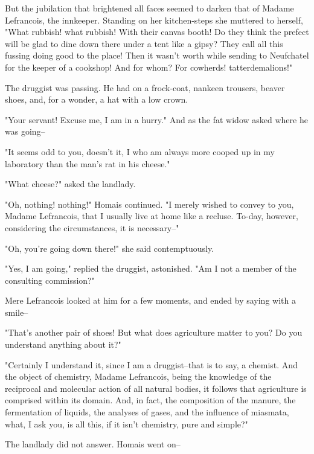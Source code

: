 \documentclass[11pt,twocolumn]{ltugboat}
\begin{document}
But the jubilation that brightened all faces seemed to darken that of
Madame Lefrancois, the innkeeper. Standing on her kitchen-steps she
muttered to herself, "What rubbish! what rubbish! With their canvas
booth! Do they think the prefect will be glad to dine down there under
a tent like a gipsy? They call all this fussing doing good to the place!
Then it wasn't worth while sending to Neufchatel for the keeper of a
cookshop! And for whom? For cowherds! tatterdemalions!"

The druggist was passing. He had on a frock-coat, nankeen trousers,
beaver shoes, and, for a wonder, a hat with a low crown.

"Your servant! Excuse me, I am in a hurry." And as the fat widow asked
where he was going--

"It seems odd to you, doesn't it, I who am always more cooped up in my
laboratory than the man's rat in his cheese."

"What cheese?" asked the landlady.

"Oh, nothing! nothing!" Homais continued. "I merely wished to convey
to you, Madame Lefrancois, that I usually live at home like a recluse.
To-day, however, considering the circumstances, it is necessary--"

"Oh, you're going down there!" she said contemptuously.

"Yes, I am going," replied the druggist, astonished. "Am I not a member
of the consulting commission?"

Mere Lefrancois looked at him for a few moments, and ended by saying
with a smile--

"That's another pair of shoes! But what does agriculture matter to you?
Do you understand anything about it?"

"Certainly I understand it, since I am a druggist--that is to say,
a chemist. And the object of chemistry, Madame Lefrancois, being the
knowledge of the reciprocal and molecular action of all natural bodies,
it follows that agriculture is comprised within its domain. And, in
fact, the composition of the manure, the fermentation of liquids, the
analyses of gases, and the influence of miasmata, what, I ask you, is
all this, if it isn't chemistry, pure and simple?"

The landlady did not answer. Homais went on--
\end{document}
